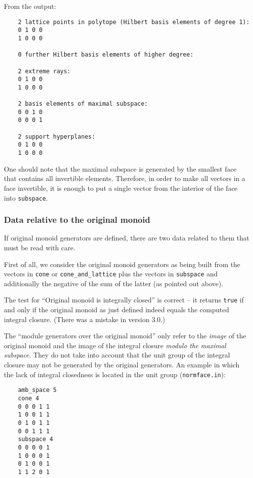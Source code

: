 \documentclass[12pt,a4paper]{scrartcl}
\theoremstyle{definition}
\begin{document}
{	From the output:
	\begin{Verbatim}
	2 lattice points in polytope (Hilbert basis elements of degree 1):
	0 1 0 0
	1 0 0 0
	
	0 further Hilbert basis elements of higher degree:
	
	2 extreme rays:
	0 1 0 0
	1 0 0 0
	
	2 basis elements of maximal subspace:
	0 0 1 0
	0 0 0 1
	
	2 support hyperplanes:
	0 1 0 0
	1 0 0 0
	\end{Verbatim}
	
	One should note that the maximal subspace is generated by the smallest face that contains all invertible elements. Therefore, in order to make all vectors in a face invertible, it is enough to put a single vector from the interior of the face into \verb|subspace|.
	
	\subsubsection{Data relative to the original monoid}
	
	If original monoid generators are defined, there are two data related to them that must be read with care.
	
	First of all, we consider the original monoid generators as being built from the vectors in \verb|cone| or \verb|cone_and_lattice| plus the vectors in \verb|subspace| and additionally the negative of the sum of the latter (as pointed out above). 
	
	The test for ``Original monoid is integrally closed'' is correct -- it returns \verb|true| if and only if the original monoid as just defined indeed equals the computed integral closure. (There was a mistake in version 3.0.)
	
	The ``module generators over the original monoid'' only refer to the \emph{image} of the original monoid and the image of the integral closure \emph{modulo the maximal subspace}. They do not take into account that the unit group of the integral closure may not be generated by the original generators. An example in which the lack of integral closedness is located in the unit group (\verb|normface.in|):
	
	\begin{Verbatim}
	amb_space 5
	cone 4
	0 0 0 1 1
	1 0 0 1 1
	0 1 0 1 1
	0 0 1 1 1
	subspace 4
	0 0 0 0 1
	1 0 0 0 1
	0 1 0 0 1
	1 1 2 0 1
	\end{Verbatim}
	
}
\end{document}
